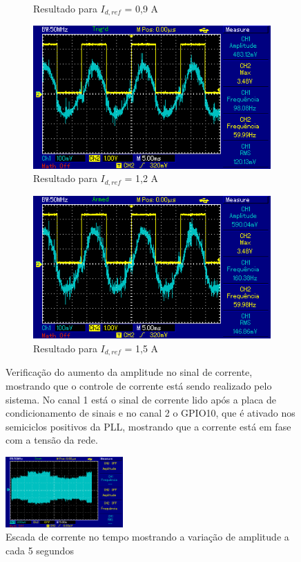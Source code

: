 \begin{figure}[!hbt]
\begin{subfigure}[b]{0.49\textwidth}
		\caption{Resultado para $I_{d,ref}$ = 0,9 A}
	\end{subfigure}
	\begin{subfigure}[b]{0.49\textwidth}
		\centering
		\includegraphics[width=\textwidth]{figuras/resultados_controle_corrente_1_2.png}
		\caption{Resultado para $I_{d,ref}$ = 1,2 A}
	\end{subfigure}
	\begin{subfigure}[b]{0.49\textwidth}
		\centering
		\includegraphics[width=\textwidth]{figuras/resultados_controle_corrente_1_5.png}
		\caption{Resultado para $I_{d,ref}$ = 1,5 A}
	\end{subfigure}
	\caption{Verificação do aumento da amplitude no sinal de corrente, mostrando que o controle de corrente está sendo realizado pelo sistema. No canal 1 está o sinal de corrente lido após a placa de condicionamento de sinais e no canal 2 o GPIO10, que é ativado nos semiciclos positivos da PLL, mostrando que a corrente está em fase com a tensão da rede.}
    \label{fig:res-controle-corrente}
\end{figure}

\begin{figure}[!hbt]
	\begin{center}
    \includegraphics[width=0.4\textwidth]{figuras/resultados_escada_corrente.png}
	\caption{Escada de corrente no tempo mostrando a variação de amplitude a cada 5 segundos}
    \label{fig:res-escada-corrente}
    \end{center}
\end{figure}
